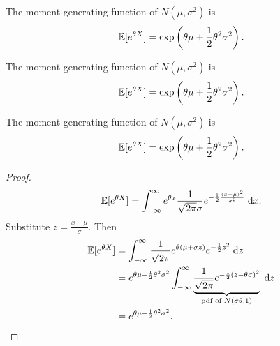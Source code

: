 \begin{note}
  \begin{field}
    \begin{prop}
      The moment generating function of $N(\mu, \sigma^2)$ is
      \[
        \mathbb{E}[e^{\theta X}] = \exp\left(\theta\mu + \frac{1}{2}\theta^2 \sigma^2\right).
      \]
    \end{prop}
  \end{field}
  \begin{field}
    \begin{prop}
      The moment generating function of $N(\mu, \sigma^2)$ is
      \[
        \mathbb{E}[e^{\theta X}] = \exp\left(\theta\mu + \frac{1}{2}\theta^2 \sigma^2\right).
      \]
    \end{prop}
  \end{field}
  \xplain{}%
\end{note}

%
\begin{note}
  \begin{field}
    \begin{prop}
      The moment generating function of $N(\mu, \sigma^2)$ is
      \[
        \mathbb{E}[e^{\theta X}] = \exp\left(\theta\mu + \frac{1}{2}\theta^2 \sigma^2\right).
      \]
    \end{prop}
  \end{field}
  \begin{field}
    \begin{proof}
     \[
      \mathbb{E}[e^{\theta X}] = \int_{-\infty}^\infty e^{\theta x} \frac{1}{\sqrt{2\pi} \sigma} e^{-\frac{1}{2} \frac{(x - \mu)^2}{\sigma^2}}\;\mathrm{d} x.
    \]
    Substitute $z = \frac{x - \mu}{\sigma}$. Then
    \begin{align*}
      \mathbb{E}[e^{\theta X}] &= \int_{-\infty}^\infty \frac{1}{\sqrt{2\pi}}e^{\theta(\mu + \sigma z)} e^{-\frac{1}{2}z^2}\;\mathrm{d} z\\
      &= e^{\theta\mu + \frac{1}{2}\theta^2\sigma^2}\int_{-\infty}^\infty \underbrace{\frac{1}{\sqrt{2\pi}}e^{-\frac{1}{2}(z - \theta \sigma)^2}}_{\text{pdf of }N(\sigma\theta, 1)}\;\mathrm{d} z\\
      &= e^{\theta\mu + \frac{1}{2}\theta^2\sigma^2}.\qedhere
    \end{align*}
    \end{proof}
  \end{field}
  \xplain{}%
\end{note}

